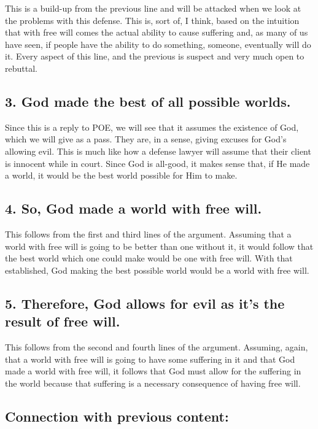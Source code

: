 This is a build-up from the previous line and will be attacked when we look at the problems with this defense. This is, sort of, I think, based on the intuition that with free will comes the actual ability to cause suffering and, as many of us have seen, if people have the ability to do something, someone, eventually will do it. Every aspect of this line, and the previous is suspect and very much open to rebuttal. 

\subsection{3. God made the best of all possible worlds.}

Since this is a reply to POE, we will see that it assumes the existence of God, which we will give as a pass. They are, in a sense, giving excuses for God's allowing evil. This is much like how a defense lawyer will assume that their client is innocent while in court. Since God is all-good, it makes sense that, if He made a world, it would be the best world possible for Him to make. 

\subsection{4. So, God made a world with free will.}

This follows from the first and third lines of the argument. Assuming that a world with free will is going to be better than one without it, it would follow that the best world which one could make would be one with free will. With that established, God making the best possible world would be a world with free will.

\subsection{5. Therefore, God allows for evil as it's the result of free will.}

This follows from the second and fourth lines of the argument. Assuming, again, that a world with free will is going to have some suffering in it and that God made a world with free will, it follows that God must allow for the suffering in the world because that suffering is a necessary consequence of having free will. 

\subsection{Connection with previous content:}

